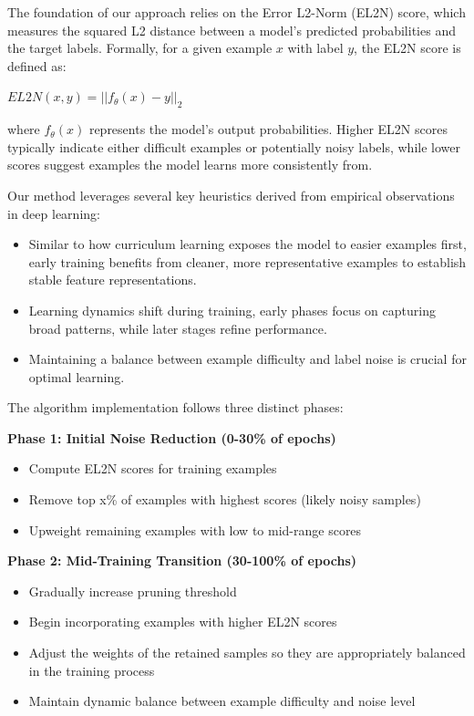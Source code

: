 \documentclass{article}
\begin{document}
The foundation of our approach relies on the Error L2-Norm (EL2N) score, which measures the squared L2 distance between a model's predicted probabilities and the target labels. Formally, for a given example $x$ with label $y$, the EL2N score is defined as:

$EL2N(x,y) = ||f_\theta(x) - y||_2$

where $f_\theta(x)$ represents the model's output probabilities. Higher EL2N scores typically indicate either difficult examples or potentially noisy labels, while lower scores suggest examples the model learns more consistently from.

Our method leverages several key heuristics derived from empirical observations in deep learning:

\begin{itemize}
    \item Similar to how curriculum learning exposes the model to easier examples first, early training benefits from cleaner, more representative examples to establish stable feature representations.
    \item Learning dynamics shift during training, early phases focus on capturing broad patterns, while later stages refine performance.
    \item Maintaining a balance between example difficulty and label noise is crucial for optimal learning.
\end{itemize}

The algorithm implementation follows three distinct phases:

\textbf{Phase 1: Initial Noise Reduction (0-30\% of epochs)} 
\begin{itemize} 
    \item Compute EL2N scores for training examples 
    \item Remove top x\% of examples with highest scores (likely noisy samples) 
    \item Upweight remaining examples with low to mid-range scores 
\end{itemize}

\textbf{Phase 2: Mid-Training Transition (30-100\% of epochs)} 
\begin{itemize} 
    \item Gradually increase pruning threshold 
    \item Begin incorporating examples with higher EL2N scores 
    \item Adjust the weights of the retained samples so they are appropriately balanced in the training process
    \item Maintain dynamic balance between example difficulty and noise level 
\end{itemize}
\end{document}

